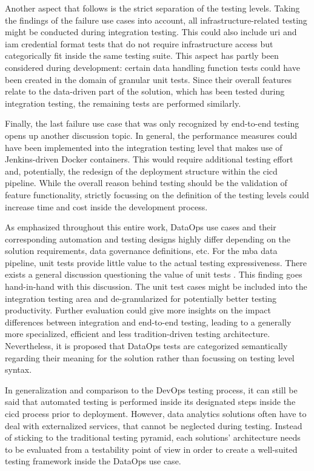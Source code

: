 Another aspect that follows is the strict separation of the testing levels. Taking the findings of the failure use cases into account, all infrastructure-related testing might be conducted during integration testing. This could also include \acs{uri} and \acs{iam} credential format tests that do not require infrastructure access but categorically fit inside the same testing suite. This aspect has partly been considered during development: certain data handling function tests could have been created in the domain of granular unit tests. Since their overall features relate to the data-driven part of the solution, which has been tested during integration testing, the remaining tests are performed similarly.

Finally, the last failure use case that was only recognized by end-to-end testing opens up another discussion topic. In general, the performance measures could have been implemented into the integration testing level that makes use of Jenkins-driven Docker containers. This would require additional testing effort and, potentially, the redesign of the deployment structure within the \ac{cicd} pipeline. While the overall reason behind testing should be the validation of feature functionality, strictly focussing on the definition of the testing levels could increase time and cost inside the development process.

As emphasized throughout this entire work, DataOps use cases and their corresponding automation and testing designs highly differ depending on the solution requirements, data governance definitions, etc. For the \ac{mba} data pipeline, unit tests provide little value to the actual testing expressiveness. There exists a general discussion questioning the value of unit tests \cite{Coplien}\cite{Golub2020}. This finding goes hand-in-hand with this discussion. The unit test cases might be included into the integration testing area and de-granularized for potentially better testing productivity. Further evaluation could give more insights on the impact differences between integration and end-to-end testing, leading to a generally more specialized, efficient and less tradition-driven testing architecture. Nevertheless, it is proposed that DataOps tests are categorized semantically regarding their meaning for the solution rather than focussing on testing level syntax.

In generalization and comparison to the DevOps testing process, it can still be said that automated testing is performed inside its designated steps inside the \ac{cicd} process prior to deployment. However, data analytics solutions often have to deal with externalized services, that cannot be neglected during testing. Instead of sticking to the traditional testing pyramid, each solutions' architecture needs to be evaluated from a testability point of view in order to create a well-suited testing framework inside the DataOps use case.



